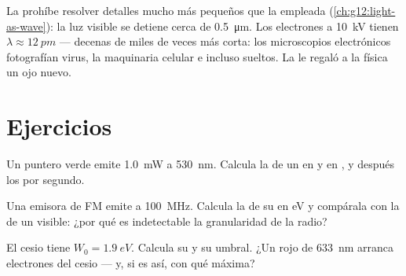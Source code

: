 \begin{example}\label{ex:g12:quantum-world:microscope}
La  prohíbe resolver detalles mucho más pequeños que la 
empleada (\cref{ch:g12:light-as-wave}): la luz visible se detiene cerca de
\qty{0.5}{\micro m}. Los electrones a \qty{10}{kV} tienen
$\lambda \approx \qty{12}{pm}$ --- decenas de miles de veces más corta: los
microscopios electrónicos fotografían virus, la maquinaria celular e incluso 
sueltos. La  le regaló a la física un ojo nuevo.
\end{example}

\section{Ejercicios}

\begin{exercise}[$\star$]\label{exo:g12:quantum-world:1}
Un puntero  verde emite \qty{1.0}{mW} a \qty{530}{nm}. Calcula la  de un
 en  y en , y después los  por segundo.
\end{exercise}

\begin{exercise}[$\star$]\label{exo:g12:quantum-world:2}
Una emisora de FM emite a \qty{100}{MHz}. Calcula la  de su  en \unit{eV}
y compárala con la de un  visible: ¿por qué es indetectable la granularidad de la
radio?
\end{exercise}

\begin{exercise}[$\star$]\label{exo:g12:quantum-world:3}
El cesio tiene $W_0 = \qty{1.9}{eV}$. Calcula su  y su 
umbral. ¿Un  rojo de \qty{633}{nm} arranca electrones del cesio --- y, si es así,
con qué  máxima?
\end{exercise}

